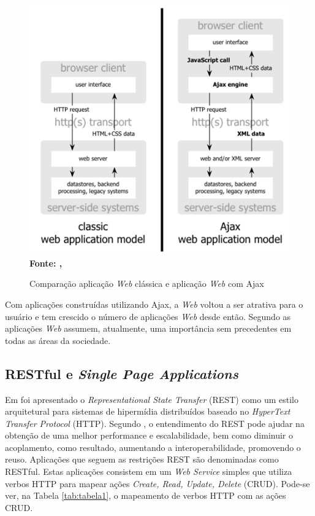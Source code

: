 \begin{figure}[!ht]
	\centering	
	\caption[\hspace{0.1cm}Comparação aplicação \textit{Web} clássica e aplicação \textit{Web} com Ajax.]{Comparação aplicação \textit{Web} clássica e aplicação \textit{Web} com Ajax}
	  \vspace{-0.4cm}
	\includegraphics[width=.6\textwidth]{figuras/ajax_comparison.png}
	 \vspace{-0.3cm}
	\\\textbf{\footnotesize Fonte: \citeauthor{garrettAjax}, \citeyear{garrettAjax}}
	\label{fig:ajax_comparison}
\end{figure}


Com aplicações construídas utilizando Ajax, a \textit{Web} voltou a ser atrativa para o usuário e tem crescido o número de 
aplicações \textit{Web} desde então. Segundo
 as aplicações \textit{Web} assumem, atualmente, uma importância sem precedentes em todas as áreas da sociedade. 

\subsection{RESTful e \textit{Single Page Applications}}
Em  foi apresentado o \textit{Representational State Transfer} (REST) como um estilo arquitetural 
para sistemas de hipermídia 
distribuídos baseado no \textit{HyperText Transfer Protocol} (HTTP). Segundo , o entendimento do REST 
pode ajudar na obtenção 
de uma melhor performance e escalabilidade, bem como diminuir o acoplamento, como resultado, aumentando a interoperabilidade, promovendo o reuso. 
Aplicações que seguem as restrições REST são denominadas como RESTful. Estas aplicações consistem 
em um \textit{\textit{Web} Service} simples que utiliza 
verbos HTTP para mapear ações \textit{Create, Read, Update, Delete} (CRUD). Pode-se ver, na Tabela \ref{tab:tabela1}, o mapeamento de verbos HTTP 
com as ações CRUD.

